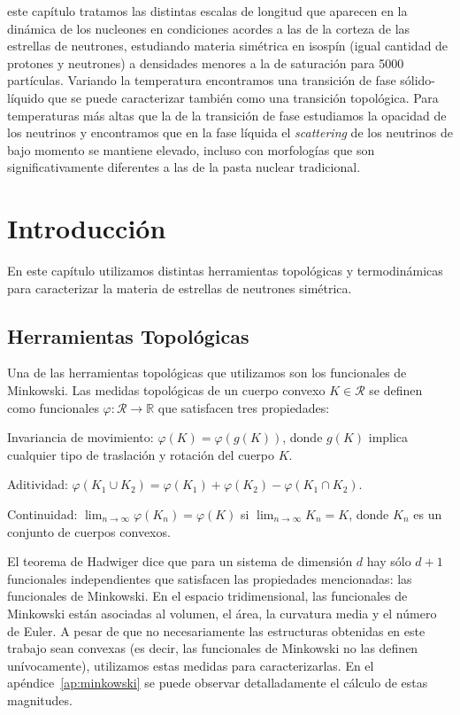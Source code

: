  este capítulo tratamos las distintas escalas de longitud que aparecen en la dinámica de los nucleones en condiciones acordes a las de la corteza de las estrellas de neutrones, estudiando materia simétrica en isospín (igual cantidad de protones y neutrones) a densidades menores a la de saturación para 5000 partículas.
Variando la temperatura encontramos una transición de fase sólido-líquido que se puede caracterizar también como una transición topológica.
Para temperaturas más altas que la de la transición de fase estudiamos la opacidad de los neutrinos y encontramos que en la fase líquida el \emph{scattering} de los neutrinos de bajo momento se mantiene elevado, incluso con morfologías que son significativamente diferentes a las de la pasta nuclear tradicional.


\section{Introducción}

En este capítulo utilizamos distintas herramientas topológicas y termodinámicas para caracterizar la materia de estrellas de neutrones simétrica.

\subsection{Herramientas Topológicas}

Una de las herramientas topológicas que utilizamos son los funcionales de Minkowski.
Las medidas topológicas de un cuerpo convexo $K \in \mathcal{R}$ se definen como funcionales $\varphi: \mathcal{R} \rightarrow \mathbb{R}$ que satisfacen tres propiedades:

\begin{description}
  \item{Invariancia de movimiento:} $\varphi(K) = \varphi(g(K))$, donde $g(K)$ implica cualquier tipo de traslación y rotación del cuerpo $K$.
  \item{Aditividad:} $\varphi(K_1 \cup K_2) = \varphi(K_1) + \varphi(K_2) - \varphi(K_1 \cap K_2)$.
  \item{Continuidad:} $\lim_{n\rightarrow\infty}\varphi(K_n) = \varphi(K)$ si $\lim_{n\rightarrow\infty}K_n = K$, donde ${K_n}$ es un conjunto de cuerpos convexos.
\end{description}

El teorema de Hadwiger dice que para un sistema de dimensión $d$ hay sólo $d+1$ funcionales independientes que satisfacen las propiedades mencionadas: las funcionales de Minkowski. En el espacio tridimensional, las funcionales de Minkowski están asociadas al volumen, el área, la curvatura media y el número de Euler. A pesar de que no necesariamente las estructuras obtenidas en este trabajo sean convexas (es decir, las funcionales de Minkowski no las definen unívocamente), utilizamos estas medidas para caracterizarlas. En el apéndice~\ref{ap:minkowski} se puede observar detalladamente el cálculo de estas magnitudes.

